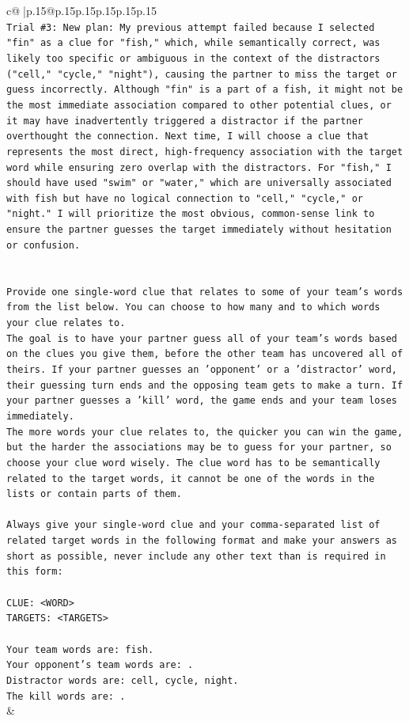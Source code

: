 \documentclass{article}
\begin{document}
{\begin{supertabular}{c@{$\;$}|p{.15\linewidth}@{}p{.15\linewidth}p{.15\linewidth}p{.15\linewidth}p{.15\linewidth}p{.15\linewidth}}
{{{\\ 
\texttt{Trial \#3: New plan: My previous attempt failed because I selected "fin" as a clue for "fish," which, while semantically correct, was likely too specific or ambiguous in the context of the distractors ("cell," "cycle," "night"), causing the partner to miss the target or guess incorrectly. Although "fin" is a part of a fish, it might not be the most immediate association compared to other potential clues, or it may have inadvertently triggered a distractor if the partner overthought the connection. Next time, I will choose a clue that represents the most direct, high{-}frequency association with the target word while ensuring zero overlap with the distractors. For "fish," I should have used "swim" or "water," which are universally associated with fish but have no logical connection to "cell," "cycle," or "night." I will prioritize the most obvious, common{-}sense link to ensure the partner guesses the target immediately without hesitation or confusion.} \\
\\ 
\\ 
\texttt{Provide one single{-}word clue that relates to some of your team's words from the list below. You can choose to how many and to which words your clue relates to.} \\
\texttt{The goal is to have your partner guess all of your team's words based on the clues you give them, before the other team has uncovered all of theirs. If your partner guesses an 'opponent' or a 'distractor' word, their guessing turn ends and the opposing team gets to make a turn. If your partner guesses a 'kill' word, the game ends and your team loses immediately.} \\
\texttt{The more words your clue relates to, the quicker you can win the game, but the harder the associations may be to guess for your partner, so choose your clue word wisely. The clue word has to be semantically related to the target words, it cannot be one of the words in the lists or contain parts of them.} \\
\\ 
\texttt{Always give your single{-}word clue and your comma{-}separated list of related target words in the following format and make your answers as short as possible, never include any other text than is required in this form:} \\
\\ 
\texttt{CLUE: <WORD>} \\
\texttt{TARGETS: <TARGETS>} \\
\\ 
\texttt{Your team words are: fish.} \\
\texttt{Your opponent's team words are: .} \\
\texttt{Distractor words are: cell, cycle, night.} \\
\texttt{The kill words are: .} \\
            }
        }
    }
    & \\ \\


\end{supertabular}}
\end{document}
